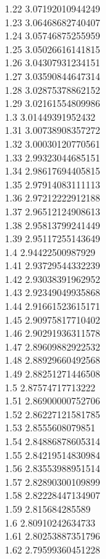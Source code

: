 {1.22	3.07192010944249\\
1.23	3.06468682740407\\
1.24	3.05746875255959\\
1.25	3.05026616141815\\
1.26	3.04307931234151\\
1.27	3.03590844647314\\
1.28	3.02875378862152\\
1.29	3.02161554809986\\
1.3	3.01449391952432\\
1.31	3.00738908357272\\
1.32	3.00030120770561\\
1.33	2.99323044685151\\
1.34	2.98617694405815\\
1.35	2.97914083111113\\
1.36	2.97212222912188\\
1.37	2.96512124908613\\
1.38	2.95813799241449\\
1.39	2.95117255143649\\
1.4	2.94422500987929\\
1.41	2.93729544332239\\
1.42	2.93038391962952\\
1.43	2.92349049935868\\
1.44	2.91661523615171\\
1.45	2.90975817710402\\
1.46	2.90291936311578\\
1.47	2.89609882922532\\
1.48	2.88929660492568\\
1.49	2.88251271446508\\
1.5	2.87574717713222\\
1.51	2.86900000752706\\
1.52	2.86227121581785\\
1.53	2.8555608079851\\
1.54	2.84886878605314\\
1.55	2.84219514830984\\
1.56	2.83553988951514\\
1.57	2.82890300109899\\
1.58	2.82228447134907\\
1.59	2.815684285589\\
1.6	2.80910242634733\\
1.61	2.80253887351796\\
1.62	2.79599360451228\\
}
